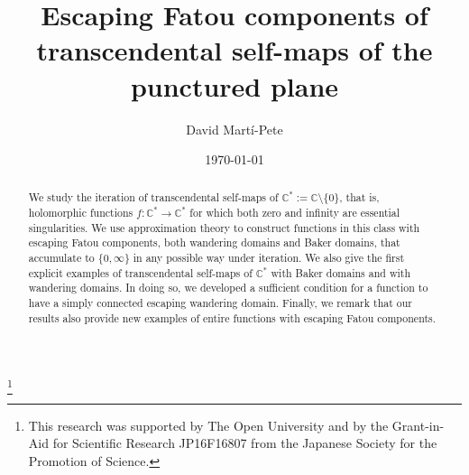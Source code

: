 \documentclass[a4paper, 12pt, reqno]{amsart}
\numberwithin{equation}{section}
\theoremstyle{plain}
\theoremstyle{definition}
\theoremstyle{remark}
\newcommand{\C}{{\mathbb{C}}}
\begin{document}
%


\title[Escaping Fatou components of transcendental self-maps of $\C^*$]{Escaping Fatou components of transcendental self-maps of the punctured plane}
\author[D. Mart\'i-Pete]{David Mart\'i-Pete}
\address{Department of Mathematics\\ Faculty of Science\\ Kyoto University\\ Kyoto 606-8502\\ Japan}
\date{\today}
\thanks{This research was supported by The Open University and by the Grant-in-Aid for Scientific Research JP16F16807 from the Japanese Society for the Promotion of Science.}

\maketitle

\begin{abstract}
We study the iteration of transcendental self-maps of $\C^*:=\C\setminus \{0\}$, that is, holomorphic functions $f:\C^*\to\C^*$ for which both zero and infinity are essential singularities. We use approximation theory to construct functions in this class with escaping Fatou components, both wandering domains and Baker domains, that accumulate to $\{0,\infty\}$ in any possible way under iteration. We also give the first explicit examples of transcendental self-maps of $\C^*$ with Baker domains and with wandering domains. In doing so, we developed a sufficient condition for a function to have a simply connected escaping wandering domain. Finally, we remark that our results also provide new examples of entire functions with escaping Fatou components. 
\end{abstract}
\end{document}
